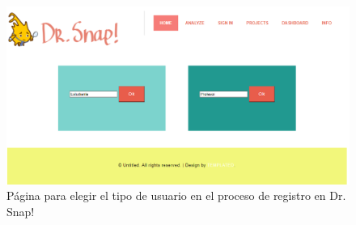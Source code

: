 \documentclass[a4paper, 12pt]{book}
\begin{document}
\begin{figure}[h]
\centering
            \includegraphics[scale=0.52]{img/tipo.PNG}
            \caption{Página para elegir el tipo de usuario en el proceso de registro en Dr. Snap!}
            \label{figura:tipo}
    \end{figure}
    
\end{document}
